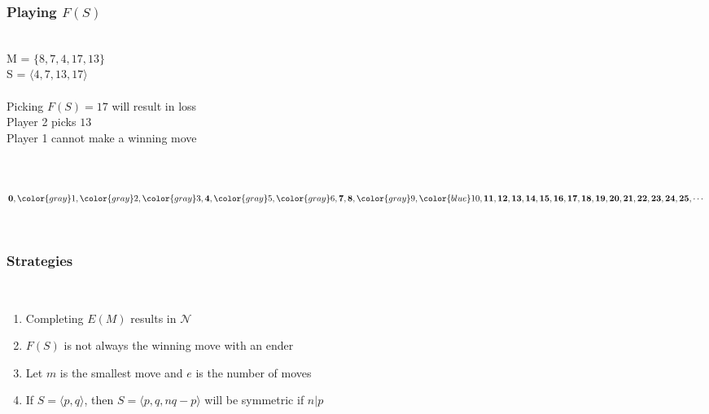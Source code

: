 \documentclass{beamer}
\begin{document}
\begin{frame}
\begin{center}
\frametitle{Playing $F \left( S \right)$}

~\\

M = $\lbrace 8, 7, 4, 17, 13 \rbrace$\\

S = $\langle 4, 7, 13, 17 \rangle$\\

~\\
{\flushleft
Picking $F \left( S \right) = 17$ will result in loss\\

Player 2 picks $13$\\

Player 1 cannot make a winning move\\
}


~\\

~\\

{\small ${\bf 0}, {\color{gray} 1}, {\color{gray} 2}, {\color{gray} 3}, {\bf 4}, {\color{gray} 5}, {\color{gray} 6}, {\bf 7}, {\bf 8}, {\color{gray} 9}, {\color{blue} 10}, {\bf 11}, {\bf 12}, {\bf 13}, {\bf 14}, {\bf 15}, {\bf 16}, {\bf 17}, {\bf 18}, {\bf 19}, {\bf 20}, {\bf 21}, {\bf 22}, {\bf 23}, {\bf 24}, {\bf 25}, \cdots$\\}

~

\end{center}
\end{frame}


\begin{frame}
\begin{center}
\frametitle{Strategies}

~\\

\begin{enumerate}

\item Completing $E \left( M \right)$ results in $\mathscr{N}$

\item $F \left( S \right)$ is not always the winning move with an ender

\item Let $m$ is the smallest move and $e$ is the number of moves

\item If $S = \langle p, q \rangle$, then $S = \langle p, q, n q - p \rangle$ will be symmetric if $n \vert p$

\end{enumerate}

\end{center}
\end{frame}
\end{document}
